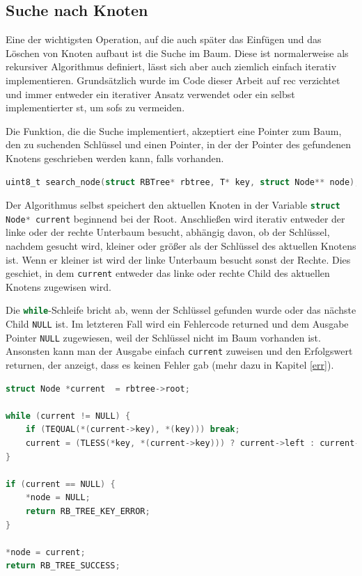 \documentclass[11pt]{article}
\newcommand{\lstin}[1]{\lstinline[language=C]{#1}}
\begin{document}
\subsection{Suche nach Knoten} \label{sea}
Eine der wichtigsten Operation, auf die auch später das Einfügen und das Löschen von Knoten aufbaut ist die Suche im Baum. Diese ist normalerweise als rekursiver Algorithmus definiert, lässt sich aber auch ziemlich einfach iterativ implementieren.
Grundsätzlich wurde im Code dieser Arbeit auf \gls{rec} verzichtet und immer entweder ein iterativer Ansatz verwendet oder ein selbst implementierter \gls{st}, um \glspl{sof} zu vermeiden.

Die Funktion, die die Suche implementiert, akzeptiert eine Pointer zum Baum, den zu suchenden Schlüssel und einen Pointer, in der der Pointer des gefundenen Knotens geschrieben werden kann, falls vorhanden.

\begin{lstlisting}[language=C]
uint8_t search_node(struct RBTree* rbtree, T* key, struct Node** node);
\end{lstlisting}

Der Algorithmus selbst speichert den aktuellen Knoten in der Variable \lstin{struct Node* current} beginnend bei der Root. Anschließen wird iterativ entweder der linke oder der rechte Unterbaum besucht, abhängig davon, ob der Schlüssel, nachdem gesucht wird, kleiner oder größer als der Schlüssel des aktuellen Knotens ist.
Wenn er kleiner ist wird der linke Unterbaum besucht sonst der Rechte. Dies geschiet, in dem \lstin{current} entweder das linke oder rechte Child des aktuellen Knotens zugewisen wird.

Die \lstin{while}-Schleife bricht ab, wenn der Schlüssel gefunden wurde oder das nächste Child \lstin{NULL} ist. Im letzteren Fall wird ein Fehlercode returned und dem Ausgabe Pointer \lstin{NULL} zugewiesen, weil der Schlüssel nicht im Baum vorhanden ist.
Ansonsten kann man der Ausgabe einfach \lstin{current} zuweisen und den Erfolgswert returnen, der anzeigt, dass es keinen Fehler gab (mehr dazu in Kapitel \ref{err}).

\begin{lstlisting}[language=C]
struct Node *current  = rbtree->root;

while (current != NULL) {
    if (TEQUAL(*(current->key), *(key))) break;
    current = (TLESS(*key, *(current->key))) ? current->left : current->right;
}

if (current == NULL) {
    *node = NULL;
    return RB_TREE_KEY_ERROR;
}

*node = current;
return RB_TREE_SUCCESS;
\end{lstlisting}
\end{document}
